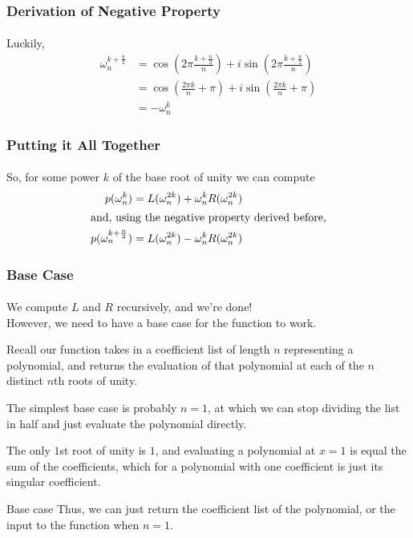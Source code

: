 \documentclass[11pt,handout]{beamer}             %
\begin{document}
\begin{frame}
\frametitle{Derivation of Negative Property}
\framesubtitle{}
Luckily, 
\begin{align*}
  \omega^{k + \frac{n}{2}}_n &= \cos(2 \pi \frac{k + \frac{n}{2}}{n}) +
  i \sin(2 \pi \frac{k + \frac{n}{2}}{n}) \\
                             &= \cos(\frac{2 \pi k}{n} + \pi) +
                             i \sin(\frac{2 \pi k}{n} + \pi) \\
                             &= -\omega_n^k
\end{align*}
\end{frame}

\begin{frame}
\frametitle{Putting it All Together}
\framesubtitle{}
So, for some power \( k \) of the base root of unity we can compute
\begin{align*}
  p(\omega^k_n) &= L(\omega^{2k}_n) + \omega^k_n R(\omega^{2k}_n) \\
  \shortintertext{and, using the negative property derived before,}
  p(\omega^{k + \frac{n}{2}}_n) &= L(\omega^{2k}_n) - \omega^k_n R(\omega^{2k}_n) \\
\end{align*}
\end{frame}

\begin{frame}
\frametitle{Base Case}
\framesubtitle{}
We compute \( L \) and \( R \) recursively, and we're done! \\
However, we need to have a base case for the function to work. \pause

Recall our function takes in a coefficient list of length \( n \) representing a
polynomial, and returns the evaluation of that polynomial at each of the
\( n \) distinct \( n \)th roots of unity. \pause

The simplest base case is probably \( n = 1 \), at which we can stop dividing the
list in half and just evaluate the polynomial directly. \pause 

The only \( 1 \)st root of unity is \( 1 \), and evaluating a polynomial
at \( x = 1 \) is equal the sum of the coefficients, which for a
polynomial with one coefficient is just its singular coefficient. \pause

\begin{block}{Base case}
  Thus, we can just return the coefficient list of the polynomial,
  or the input to the function when \( n = 1 \). 
\end{block}
\end{frame}
\end{document}
